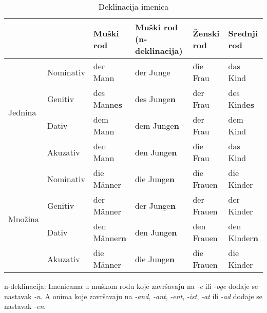 \documentclass[12pt,german]{article}
\newcommand{\nastavak}[1]{\emph{-#1}}
\begin{document}
\begin{multicols}{2}
\begin{table*}[htb]
\caption{Deklinacija imenica}
\begin{tabular}{llllll}
\toprule
  &  & Muški rod & Muški rod (n-deklinacija) & Ženski rod & Srednji rod \\
\midrule
\multirow{4}{3mm}{\begin{sideways}\parbox{15mm}{Jednina}\end{sideways}}
& Nominativ & der Mann & der Junge & die Frau & das Kind \\
& Genitiv & des Mann\bf{es} & des Junge\bf{n} & der Frau & des Kind\bf{es} \\
& Dativ & dem Mann & dem Junge\bf{n} & der Frau & dem Kind \\
& Akuzativ & den Mann & den Junge\bf{n} & die Frau & das Kind \\
\midrule
\multirow{4}{3mm}{\begin{sideways}\parbox{15mm}{Množina}\end{sideways}}
& Nominativ & die M\"anner & die Junge\bf{n} & die Frauen & die Kinder \\
& Genitiv & der M\"anner & der Junge\bf{n} & der Frauen & der Kinder \\
& Dativ & den M\"anner\bf{n} & den Junge\bf{n} & den Frauen & den Kinder\bf{n} \\
& Akuzativ & die M\"anner & die Junge\bf{n} & die Frauen & die Kinder \\
\bottomrule
\end{tabular}
\begin{tablenotes}
  \small
  \item n-deklinacija: Imenicama u muškom rodu koje završavaju na \nastavak{e}
    ili \nastavak{oge} dodaje se nastavak \nastavak{n}. A onima koje završavaju
    na \nastavak{and}, \nastavak{ant}, \nastavak{ent}, \nastavak{ist},
    \nastavak{at} ili \nastavak{ad} dodaje se nastavak \nastavak{en}.
\end{tablenotes}
\end{table*}


\end{multicols}
\end{document}
